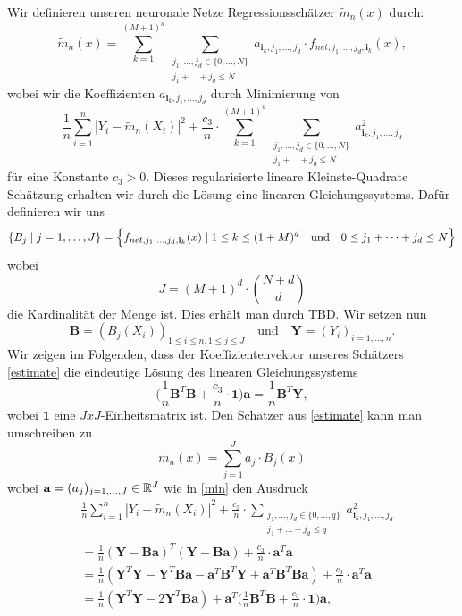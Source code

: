 Wir definieren unseren neuronale Netze Regressionsschätzer $\tilde{m}_n(x)$ durch$\colon$
\begin{equation}
\label{estimate}
\tilde{m}_n(x) = \sum_{k = 1}^{(M + 1)^d} \sum_{\substack{ j_1,\dots,j_d \in \{0,\dots,N\} \\j_1+\dots +j_d \leq N}} a_{\mathbf{i}_k,j_1,\dots,j_d} \cdot f_{net,j_1,\dots,j_d,\mathbf{i}_k}(x),
\end{equation}
wobei wir die Koeffizienten $a_{\mathbf{i}_k,j_1,\dots,j_d}$ durch Minimierung von 
\begin{equation}
\label{min} \frac{1}{n} \sum_{i = 1}^n|Y_i - \tilde{m}_n(X_i)|^2 + \frac{c_3}{n} \cdot \sum_{k = 1}^{(M + 1)^d} \sum_{\substack{ j_1,\dots,j_d \in \{0,\dots,N\} \\j_1+\dots +j_d \leq N}} a_{\mathbf{i}_k,j_1,\dots,j_d}^2
\end{equation}
für eine Konstante $c_3 > 0.$ Dieses regularisierte lineare Kleinste-Quadrate Schätzung erhalten wir durch die Lösung eine linearen Gleichungssystems. Dafür definieren wir uns 
\begin{align*} 
\{B_j \mid j = 1,\dots,J\} = \Bigl\{f_{net,j_1,\dots,j_d,\mathbf{i}_k}(x) \mid 1\leq k \leq (1 + M)^d \quad \text{und} \quad 0 \leq j_1 + \cdots + j_d \leq N \Bigr\}
\end{align*}
wobei
$$ J = (M + 1)^d \cdot \binom{N + d}{d}$$ die Kardinalität der Menge ist.
Dies erhält man durch TBD.
Wir setzen nun 
$$ \mathbf{B} = (B_j(X_i))_{1\leq i \leq n,1\leq j \leq J} \quad \text{und} \quad \mathbf{Y} = (Y_i)_{i = 1,\dots,n}.$$
Wir zeigen im Folgenden, dass der Koeffizientenvektor unseres Schätzers \ref{estimate} die eindeutige Lösung des linearen Gleichungssystems 
\begin{equation}
\label{les}
\bigg(\frac{1}{n}\mathbf{B}^T\mathbf{B} + \frac{c_3}{n} \cdot \mathbf{1} \bigg) \mathbf{a} = \frac{1}{n} \mathbf{B}^T\mathbf{Y},
\end{equation}
wobei $\mathbf{1}$ eine $JxJ$-Einheitsmatrix ist.
Den Schätzer aus \ref{estimate} kann man umschreiben zu 
$$ \tilde{m}_n(x) = \sum_{j = 1}^J a_j \cdot B_j(x)$$
wobei $\mathbf{a} = (a_j)_{j = 1,\dots,J} \in \mathbb{R}^J$ wie in \ref{min} den Ausdruck
\begin{equation}
\begin{split}
& \frac{1}{n} \sum_{i = 1}^n|Y_i - \tilde{m}_n(X_i)|^2 + \frac{c_3}{n} \cdot \sum_{\substack{ j_1,\dots,j_d \in \{0,\dots,q\} \\j_1+\dots +j_d \leq q}} a_{\mathbf{i}_k,j_1,\dots,j_d}^2 \\
& = \frac{1}{n}(\mathbf{Y} - \mathbf{B}\mathbf{a})^T(\mathbf{Y} - \mathbf{B}\mathbf{a}) + \frac{c_3}{n} \cdot \mathbf{a}^T\mathbf{a} \\
& = \frac{1}{n}(\mathbf{Y}^T\mathbf{Y} - \mathbf{Y}^T\mathbf{B}\mathbf{a} - \mathbf{a}^T\mathbf{B}^T\mathbf{Y} + \mathbf{a}^T\mathbf{B}^T\mathbf{B}\mathbf{a}) + \frac{c_3}{n} \cdot \mathbf{a}^T\mathbf{a} \\
& = \frac{1}{n}(\mathbf{Y}^T\mathbf{Y} - 2\mathbf{Y}^T\mathbf{B}\mathbf{a}) + \mathbf{a}^T\bigg(\frac{1}{n} \mathbf{B}^T\mathbf{B} + \frac{c_3}{n} \cdot \mathbf{1}\bigg) \mathbf{a}, 
\end{split}
\end{equation} 
